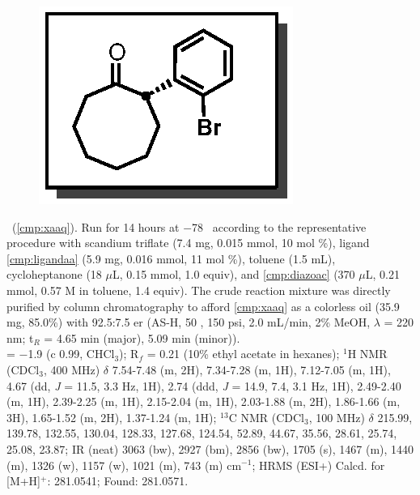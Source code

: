 \pagebreak
\begin{figure}
  \vspace{-23pt}
  \begin{center}
    \includegraphics[scale=0.8]{chp_asymmetric/images/xaaq}
  \end{center}
  \vspace{-30pt}
\end{figure}\noindent \textbf{\CMPxaaq}\ (\ref{cmp:xaaq}). Run for 14 hours
at $-$78 \degc\  according to the representative procedure with scandium triflate (7.4
mg, 0.015 mmol, 10 mol \%), ligand \ref{cmp:ligandaa} (5.9 mg, 0.016 mmol, 11
mol \%), toluene (1.5 mL), cycloheptanone (18 $\mu$L, 0.15 mmol, 1.0 equiv), and
\ref{cmp:diazoac} (370 $\mu$L, 0.21 mmol, 0.57 M in toluene, 1.4 equiv). The
crude reaction mixture was directly purified by column chromatography to afford
\ref{cmp:xaaq} as a colorless oil (35.9 mg, 85.0\%) with 92.5:7.5 er
(AS-H, 50 \degc, 150 psi, 2.0 mL/min, 2\% MeOH, $\lambda$ = 220 nm; t$_R$ = 4.65
min (major), 5.09 min (minor)). \\ 
\rotation = $-$1.9 (c 0.99, CHCl$_3$); R$_f$ = 0.21 (10\% ethyl acetate in
hexanes); $^1$H NMR (CDCl$_3$, 400 MHz) $\delta$ 7.54-7.48 (m, 2H), 7.34-7.28
(m, 1H), 7.12-7.05 (m, 1H), 4.67 (dd, \textit{J} = 11.5, 3.3 Hz, 1H), 2.74 (ddd,
\textit{J} = 14.9, 7.4, 3.1 Hz, 1H), 2.49-2.40 (m, 1H), 2.39-2.25 (m, 1H),
2.15-2.04 (m, 1H), 2.03-1.88 (m, 2H), 1.86-1.66 (m, 3H), 1.65-1.52 (m, 2H),
1.37-1.24 (m, 1H); $^{13}$C NMR (CDCl$_3$, 100 MHz) $\delta$ 215.99, 139.78,
132.55, 130.04, 128.33, 127.68, 124.54, 52.89, 44.67, 35.56, 28.61, 25.74,
25.08, 23.87; IR (neat) 3063 (bw), 2927 (bm), 2856 (bw), 1705 (s), 1467 (m),
1440 (m), 1326 (w), 1157 (w), 1021 (m), 743 (m) cm$^{-1}$; HRMS (ESI+) Calcd.
for  [M+H]$^+$: 281.0541; Found: 281.0571. \\
